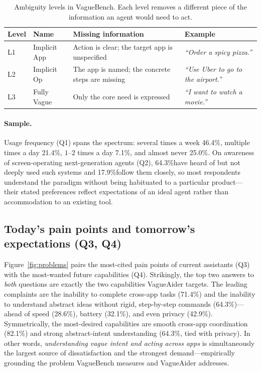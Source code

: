 \documentclass[11pt]{article}
\newcommand{\pct}{\%}
\begin{document}
\begin{table}[t]
  \centering
  \caption{Ambiguity levels in VagueBench. Each level removes a different piece
  of the information an agent would need to act.}
  \label{tab:levels}
  \small
  \begin{tabularx}{\linewidth}{@{}l l Y l@{}}
    \toprule
    \textbf{Level} & \textbf{Name} & \textbf{Missing information} & \textbf{Example} \\
    \midrule
    L1 & Implicit App & Action is clear; the target app is unspecified & \textit{``Order a spicy pizza.''} \\
    L2 & Implicit Op  & The app is named; the concrete steps are missing & \textit{``Use Uber to go to the airport.''} \\
    L3 & Fully Vague  & Only the core need is expressed & \textit{``I want to watch a movie.''} \\
    \bottomrule
  \end{tabularx}
\end{table}

\paragraph{Sample.}
Usage frequency (Q1) spans the spectrum: several times a week 46.4\pct,
multiple times a day 21.4\pct, $1$--$2$ times a day 7.1\pct, and almost
never 25.0\pct. On awareness of screen-operating next-generation agents (Q2),
64.3\pct have heard of but not deeply used such systems and 17.9\pct follow
them closely, so most respondents understand the paradigm without being
habituated to a particular product---their stated preferences reflect
expectations of an ideal agent rather than accommodation to an existing tool.

\subsection{Today's pain points and tomorrow's expectations (Q3, Q4)}

Figure~\ref{fig:problems} pairs the most-cited pain points of current assistants
(Q3) with the most-wanted future capabilities (Q4). Strikingly, the top two
answers to \emph{both} questions are exactly the two capabilities VagueAider
targets. The leading complaints are the inability to complete cross-app tasks
(71.4\pct) and the inability to understand abstract ideas without rigid,
step-by-step commands (64.3\pct)---ahead of speed (28.6\pct), battery
(32.1\pct), and even privacy (42.9\pct). Symmetrically, the most-desired
capabilities are smooth cross-app coordination (82.1\pct) and strong
abstract-intent understanding (64.3\pct, tied with privacy). In other words,
\emph{understanding vague intent and acting across apps} is simultaneously the
largest source of dissatisfaction and the strongest demand---empirically
grounding the problem VagueBench measures and VagueAider addresses.
\end{document}
